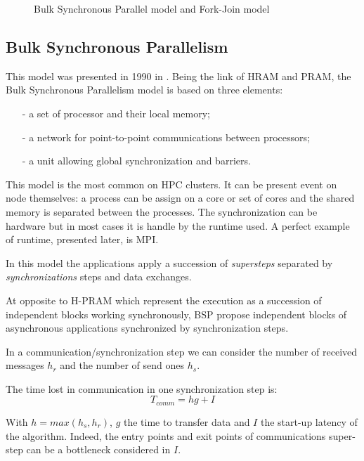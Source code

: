 \begin{figure}
\begin{center}

\end{center}
\caption{Bulk Synchronous Parallel model and Fork-Join model}
\label{fig:3_SOFT:bsp_fj}
\end{figure}

\subsection{Bulk Synchronous Parallelism }
This model was presented in 1990 in \cite{valiant1990bridging}.
Being the link of HRAM and PRAM, the Bulk Synchronous Parallelism model is based on three elements:
\begin{itemize}[noitemsep,nolistsep]
  \item[-] a set of processor and their local memory;
  \item[-] a network for point-to-point communications between processors;
  \item[-] a unit allowing global synchronization and barriers.
\end{itemize}
This model is the most common on HPC clusters. 
It can be present event on node themselves: a process can be assign on a core or set of cores and the shared memory is separated between the processes. 
The synchronization can be hardware but in most cases it is handle by the runtime used.
A perfect example of runtime, presented later, is MPI. 

In this model the applications apply a succession of \textit{supersteps} separated by \textit{synchronizations} steps and data exchanges.

At opposite to H-PRAM which represent the execution as a succession of independent blocks working synchronously, BSP propose independent blocks of asynchronous applications synchronized by synchronization steps. 

In a communication/synchronization step we can consider the number of received messages $h_r$ and the number of send ones $h_s$.

The time lost in communication in one synchronization step is:
\begin{equation}
  T_{comm} = hg + I
\end{equation}

With $h = max(h_s,h_r)$, $g$ the time to transfer data and $I$ the start-up latency of the algorithm.
Indeed, the entry points and exit points of communications super-step can be a bottleneck considered in $I$.

